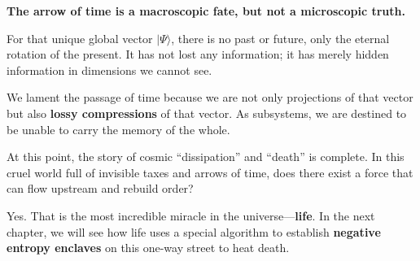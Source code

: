 \textbf{The arrow of time is a macroscopic fate, but not a microscopic truth.}

For that unique global vector $|\Psi\rangle$, there is no past or future, only the eternal rotation of the present. It has not lost any information; it has merely hidden information in dimensions we cannot see.

We lament the passage of time because we are not only projections of that vector but also \textbf{lossy compressions} of that vector. As subsystems, we are destined to be unable to carry the memory of the whole.

At this point, the story of cosmic ``dissipation'' and ``death'' is complete. In this cruel world full of invisible taxes and arrows of time, does there exist a force that can flow upstream and rebuild order?

Yes. That is the most incredible miracle in the universe---\textbf{life}. In the next chapter, we will see how life uses a special algorithm to establish \textbf{negative entropy enclaves} on this one-way street to heat death.

